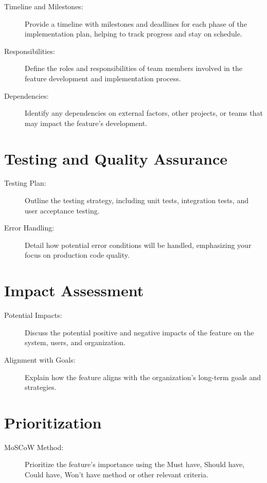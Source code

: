 \documentclass{article}
\begin{document}
\begin{description}
    \item[Timeline and Milestones:]
    Provide a timeline with milestones and deadlines for each phase of the implementation plan, helping to track progress and stay on schedule.

    \item[Responsibilities:]
    Define the roles and responsibilities of team members involved in the feature development and implementation process.

    \item[Dependencies:]
    Identify any dependencies on external factors, other projects, or teams that may impact the feature's development.

\end{description}

\section{Testing and Quality Assurance}
\begin{description}
    \item[Testing Plan:] Outline the testing strategy, including unit tests, integration tests, and user acceptance testing.
    \item[Error Handling:] Detail how potential error conditions will be handled, emphasizing your focus on production code quality.
\end{description}

\section{Impact Assessment}
\begin{description}
    \item[Potential Impacts:] Discuss the potential positive and negative impacts of the feature on the system, users, and organization.
    \item[Alignment with Goals:] Explain how the feature aligns with the organization's long-term goals and strategies.
\end{description}

\section{Prioritization}
\begin{description}
    \item[MoSCoW Method:] Prioritize the feature's importance using the Must have, Should have, Could have, Won't have method or other relevant criteria.
\end{description}
\end{document}
